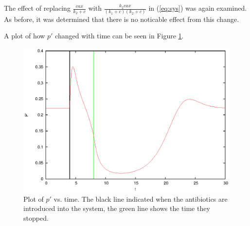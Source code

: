 \documentclass{article}
\begin{document}
The effect of replacing $\frac{cax}{k_2 +c}$ with $\frac{k_2 cax}{(k_1+c)(k_2+c)}$ in (\ref{eq:sys}) was again examined. As before, it was determined that there is no noticable effect from this change.

A plot of how $p'$ changed with time can be seen in Figure \ref{plot:tp'}.

\begin{figure}
  \centering
  \includegraphics[scale = 1]{timePprime.eps}
  \caption{Plot of $p'$ vs. time. The black line indicated when the antibiotics are introduced into the system, the green line shows the time they stopped.}
  \label{plot:tp'}
\end{figure}
\end{document}

